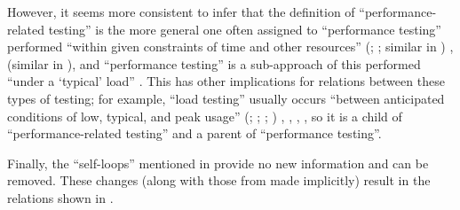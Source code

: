 However, it seems more consistent to infer
that the definition of ``performance-related testing'' is the more general one
often assigned to ``performance testing'' performed ``within given constraints
of time and other resources'' \ifnotpaper (\citealp[p.~7]{IEEE2022};
    \citeyear[p.~320]{IEEE2017}; similar in \citealp[p.~1187]{Moghadam2019})%
\else \cite[p.~320]{IEEE2017}, \cite[p.~7]{IEEE2022}
    (similar in \cite[p.~1187]{Moghadam2019})\fi, and
``performance testing'' is a sub-approach of this performed ``under a `typical'
load'' \citep[p.~39]{IEEE2021}. This has other implications for relations
between these types of testing; for example, ``load testing'' usually occurs
``between anticipated conditions of low, typical, and peak usage''
\ifnotpaper (\citealp[p.~5]{IEEE2022}; \citeyear[p.~39]{IEEE2021};
    \citeyear[p.~253]{IEEE2017}; \citealpISTQB{})%
\else \cite[p.~253]{IEEE2017}, \cite{ISTQB}, \cite[p.~5]{IEEE2022},
    \cite[p.~39]{IEEE2021}\fi, so it is a child of ``performance-related
testing'' and a parent of ``performance testing''.

Finally, the ``self-loops'' mentioned in  provide no new
information and can be removed. These changes (along with those from
 made implicitly) result in
the relations shown in .

